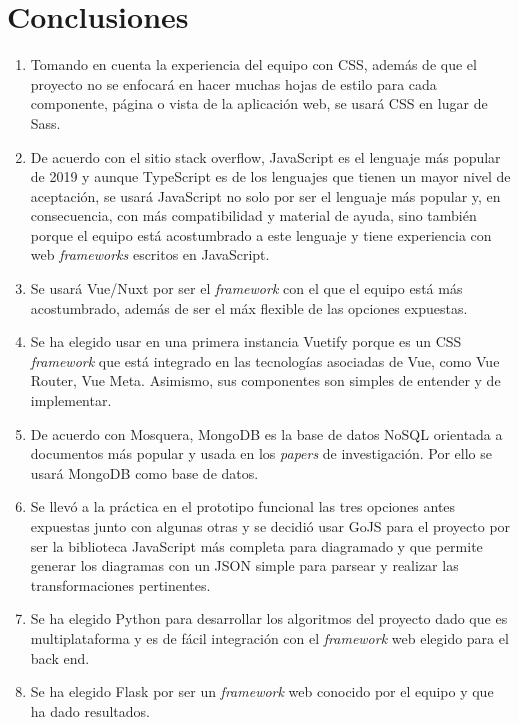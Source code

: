 \section{Conclusiones}

\begin{enumerate}
    \item Tomando en cuenta la experiencia del equipo con CSS, además de que el proyecto no se enfocará en hacer muchas hojas de estilo para cada componente, página o vista de la aplicación web, se usará CSS en lugar de Sass.
    \item De acuerdo con el sitio stack overflow\cite{noauthor_stack_nodate}, JavaScript es el lenguaje más popular de 2019 y aunque TypeScript es de los lenguajes que tienen un mayor nivel de aceptación, se usará JavaScript no solo por ser el lenguaje más popular y, en consecuencia, con más compatibilidad y material de ayuda, sino también porque el equipo está acostumbrado a este lenguaje y tiene experiencia con web \textit{frameworks} escritos en JavaScript.
    \item Se usará Vue/Nuxt por ser el \textit{framework} con el que el equipo está más acostumbrado, además de ser el máx flexible de las opciones expuestas.
    \item Se ha elegido usar en una primera instancia Vuetify porque es un CSS \textit{framework} que está integrado en las tecnologías asociadas de Vue, como Vue Router, Vue Meta. Asimismo, sus componentes son simples de entender y de implementar.
    \item De acuerdo con Mosquera\cite{martinez-mosquera_modeling_2020}, MongoDB es la base de datos NoSQL orientada a documentos más popular y usada en los \textit{papers} de investigación. Por ello se usará MongoDB como base de datos.
    \item Se llevó a la práctica en el prototipo funcional las tres opciones antes expuestas junto con algunas otras y se decidió usar GoJS para el proyecto por ser la biblioteca JavaScript más completa para diagramado y que permite generar los diagramas con un JSON simple para parsear y realizar las transformaciones pertinentes.
    \item Se ha elegido Python para desarrollar los algoritmos del proyecto dado que es multiplataforma y es de fácil integración con el \textit{framework} web elegido para el back end.
    \item Se ha elegido Flask por ser un \textit{framework} web conocido por el equipo y que ha dado resultados.

\end{enumerate}
